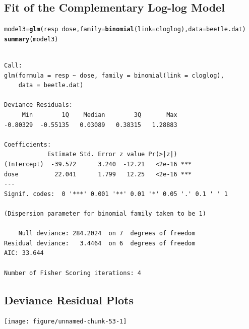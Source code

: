 \documentclass{article}\usepackage[]{graphicx}\usepackage[svgnames]{xcolor}
\makeatletter
\newcommand{\hlopt}[1]{\textcolor[rgb]{0,0,0}{#1}}%
\newcommand{\hlstd}[1]{\textcolor[rgb]{0.345,0.345,0.345}{#1}}%
\newcommand{\hlkwb}[1]{\textcolor[rgb]{0.69,0.353,0.396}{#1}}%
\newcommand{\hlkwc}[1]{\textcolor[rgb]{0.333,0.667,0.333}{#1}}%
\newcommand{\hlkwd}[1]{\textcolor[rgb]{0.737,0.353,0.396}{\textbf{#1}}}%
\newenvironment{kframe}{%
 \def\at@end@of@kframe{}%
 \ifinner\ifhmode%
  \def\at@end@of@kframe{\end{minipage}}%
  \begin{minipage}{\columnwidth}%
 \fi\fi%
 \def\FrameCommand##1{\hskip\@totalleftmargin \hskip-\fboxsep
 \colorbox{shadecolor}{##1}\hskip-\fboxsep
     \hskip-\linewidth \hskip-\@totalleftmargin \hskip\columnwidth}%
 \MakeFramed {\advance\hsize-\width
   \@totalleftmargin\z@ \linewidth\hsize
   \@setminipage}}%
 {\par\unskip\endMakeFramed%
 \at@end@of@kframe}
\newenvironment{knitrout}{}{} %
\makeatother
\begin{document}
\subsection*{Fit of the Complementary Log-log Model}
\begin{knitrout}
\color{fgcolor}\begin{kframe}
\begin{alltt}
\hlstd{model3} \hlkwb{=} \hlkwd{glm}\hlstd{(resp} \hlopt{~} \hlstd{dose,} \hlkwc{family} \hlstd{=} \hlkwd{binomial}\hlstd{(}\hlkwc{link} \hlstd{= cloglog),} \hlkwc{data} \hlstd{= beetle.dat)}
\hlkwd{summary}\hlstd{(model3)}
\end{alltt}
\begin{verbatim}

Call:
glm(formula = resp ~ dose, family = binomial(link = cloglog), 
    data = beetle.dat)

Deviance Residuals: 
     Min        1Q    Median        3Q       Max  
-0.80329  -0.55135   0.03089   0.38315   1.28883  

Coefficients:
            Estimate Std. Error z value Pr(>|z|)    
(Intercept)  -39.572      3.240  -12.21   <2e-16 ***
dose          22.041      1.799   12.25   <2e-16 ***
---
Signif. codes:  0 '***' 0.001 '**' 0.01 '*' 0.05 '.' 0.1 ' ' 1

(Dispersion parameter for binomial family taken to be 1)

    Null deviance: 284.2024  on 7  degrees of freedom
Residual deviance:   3.4464  on 6  degrees of freedom
AIC: 33.644

Number of Fisher Scoring iterations: 4
\end{verbatim}
\end{kframe}
\end{knitrout}
\subsection*{Deviance Residual Plots}
\begin{knitrout}
\color{fgcolor}

{\centering \texttt{[image: figure/unnamed-chunk-53-1]} 

}


\end{knitrout}
\end{document}
